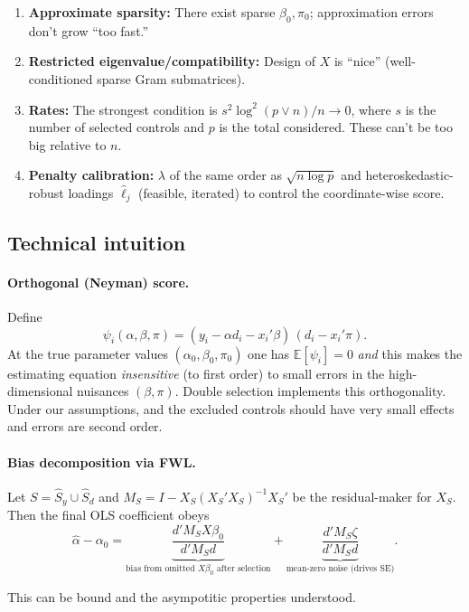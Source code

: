 \begin{enumerate}
\item \textbf{Approximate sparsity:} There exist sparse $\beta_0,\pi_0$; approximation errors don't grow ``too fast.''
\item \textbf{Restricted eigenvalue/compatibility:} Design of $X$ is ``nice'' (well-conditioned sparse Gram submatrices).
\item \textbf{Rates:} The strongest condition is $s^2\log^2(p\vee n)/n\to 0$, where $s$ is the number of selected controls and $p$ is the total considered. These can't be too big relative to $n$.
\item \textbf{Penalty calibration:} $\lambda$ of the same order as $\sqrt{n\log p}$ and heteroskedastic-robust loadings $\hat\ell_j$ (feasible, iterated) to control the coordinate-wise score.
\end{enumerate}

\bigskip

\subsection*{Technical intuition}

\paragraph{Orthogonal (Neyman) score.} Define
\[
\psi_i(\alpha,\beta,\pi)=(y_i-\alpha d_i - x_i'\beta)\,(d_i-x_i'\pi).
\]
At the true parameter values $(\alpha_0,\beta_0,\pi_0)$ one has $\mathbb{E}[\psi_i]=0$ \emph{and} this makes the estimating equation \emph{insensitive} (to first order) to small errors in the high-dimensional nuisances $(\beta,\pi)$.
Double selection implements this orthogonality. Under our assumptions, and the excluded controls should have very small effects and errors are second order. 

\paragraph{Bias decomposition via FWL.} Let $S=\widehat S_y\cup \widehat S_d$ and $M_S=I-X_S(X_S'X_S)^{-1}X_S'$ be the residual-maker for $X_S$. Then the final OLS coefficient obeys
\[
\widehat\alpha-\alpha_0
=\underbrace{\frac{d'M_S X\beta_0}{d'M_S d}}_{\text{bias from omitted $X\beta_0$ after selection}}
+\underbrace{\frac{d'M_S \zeta}{d'M_S d}}_{\text{mean-zero noise (drives SE)}}.
\]

This can be bound and the asympotitic properties understood.

